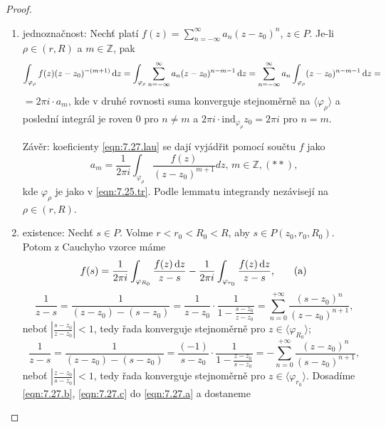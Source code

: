 \begin{proof}

\begin{enumerate}
 \item jednoznačnost: Nechť platí $f(z)=\sum\limits_{n=-\infty}^\infty a_n(z-z_0)^n$, $z \in P$. Je-li $\rho \in (r, R)$ a $m \in \mathbb{Z}$, pak 
$$
\int_{\varphi_\rho}f(z)(z-z_0)^{-(m+1)} \mathop{}\!\mathrm{d} z = \int_{\varphi_\rho} \sum\limits_{n=-\infty}^{\infty} a_n(z-z_0)^{n-m-1} \mathop{}\!\mathrm{d} z = \sum\limits_{n=-\infty}^{\infty} a_n \int_{\varphi_\rho}(z-z_0)^{n-m-1} \mathop{}\!\mathrm{d} z = 
$$
$=2\pi i \cdot a_m$, kde v druhé rovnosti suma konverguje stejnoměrně na $\langle\varphi_\rho \rangle$ a poslední integrál je roven $0$ pro $n \neq m$ a $2\pi i \cdot \text{ind}_{\varphi_\rho}z_0=2\pi i$ pro $n=m$.

Závěr: koeficienty \cref{eqn:7.27.lau} se dají vyjádřit pomocí součtu $f$ jako 
\begin{equation}
    a_m=\frac{1}{2 \pi i}\int_{\varphi_\rho}\frac{f(z)}{(z-z_0)^{m+1}} dz\text{, } m \in \mathbb{Z}, (**)\text{,}
    \tag{**}
    \label{eqn:7.27.**}
\end{equation}
kde $\varphi_\rho$ je jako v \cref{eqn:7.25.tr}. Podle lemmatu integrandy nezávisejí na $\rho \in (r,R)$.
\item existence: Nechť $s \in P$. Volme $r<r_0<R_0<R$, aby $s \in P(z_0, r_0, R_0)$. Potom z Cauchyho vzorce máme \begin{equation}
    f(s)=\frac{1}{2 \pi i}\int_{\varphi_{R_0}}\frac{f(z) \mathop{}\!\mathrm{d} z}{z-s}-\frac{1}{2 \pi i}\int_{\varphi_{r_0}}\frac{f(z) \mathop{}\!\mathrm{d} z}{z-s}\text{,}
    \tag{a}
    \label{eqn:7.27.a}
\end{equation}
\begin{equation}
    \frac{1}{z-s}=\frac{1}{(z-z_0)-(s-z_0)}=\frac{1}{z-z_0}\cdot \frac{1}{1-\frac{s-z_0}{z-z_0}}=\sum\limits_{n=0}^{+\infty}\frac{(s-z_0)^n}{(z-z_0)^{n+1}}\text{,}
    \tag{b}
    \label{eqn:7.27.b}
\end{equation}
neboť $\left|\frac{s-z_0}{z-z_0}\right|<1$, tedy řada konverguje stejnoměrně pro $z \in \langle\varphi_{R_0} \rangle$;
\begin{equation}
    \frac{1}{z-s}=\frac{1}{(z-z_0)-(s-z_0)}=\frac{(-1)}{s-z_0}\cdot \frac{1}{1-\frac{z-z_0}{s-z_0}}=-\sum\limits_{n=0}^{+\infty}\frac{(z-z_0)^n}{(s-z_0)^{n+1}}\text{,}
    \tag{c}
    \label{eqn:7.27.c}   
\end{equation}
neboť $\left|\frac{z-z_0}{s-z_0}\right|<1$, tedy řada konverguje stejnoměrně pro $z \in \langle\varphi_{r_0} \rangle$.
Dosadíme \cref{eqn:7.27.b}, \cref{eqn:7.27.c} do \cref{eqn:7.27.a} a dostaneme

\end{enumerate}
\end{proof}

